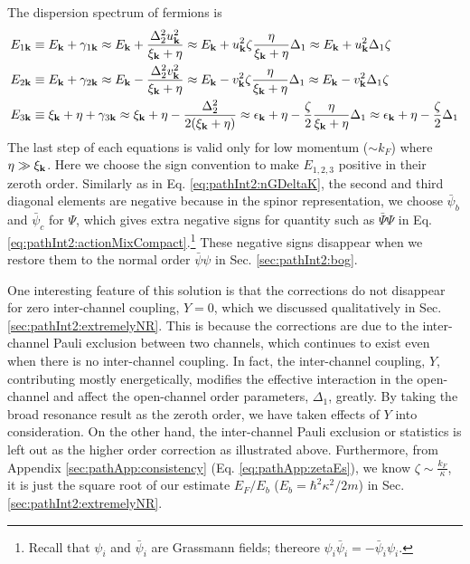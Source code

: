 The dispersion spectrum of fermions is
\begin{align}\label{eq:pathInt2:xiExpand}
E_{1\mathbf{k}}&\equiv{}E_{\mathbf{k}}+\gamma_{1\mathbf{k}}\approx{}E_{\mathbf{k}}+\frac{\Delta_{2}^{2}u_{\mathbf{k}}^{2}}{\xi_{\mathbf{k}}+\eta}
\approx{}E_{\mathbf{k}}+u_{\mathbf{k}}^{2}\zeta\frac{\eta}{\xi_{\mathbf{k}}+\eta}\Delta_{1}
\approx{}E_{\mathbf{k}}+u_{\mathbf{k}}^{2}\Delta_{1}\zeta\\
E_{2\mathbf{k}}&\equiv{}E_{\mathbf{k}}+\gamma_{2\mathbf{k}}\approx{}E_{\mathbf{k}}-\frac{\Delta_{2}^{2}v_{\mathbf{k}}^{2}}{\xi_{\mathbf{k}}+\eta}
\approx{}E_{\mathbf{k}}-v_{\mathbf{k}}^{2}\zeta\frac{\eta}{\xi_{\mathbf{k}}+\eta}\Delta_{1}
\approx{}E_{\mathbf{k}}-v_{\mathbf{k}}^{2}\Delta_{1}\zeta\label{eq:pathInt2:xiExpand2}\\
E_{3\mathbf{k}}&\equiv{}\xi_{\mathbf{k}}+\eta+\gamma_{3\mathbf{k}}\approx{}\xi_{\mathbf{k}}+\eta-\frac{\Delta_{2}^{2}}{2(\xi_{\mathbf{k}}+\eta)}
\approx{}\epsilon_{\mathbf{k}}+\eta-\frac{\zeta}{2}\frac{\eta}{\xi_{\mathbf{k}}+\eta}\Delta_{1}
\approx{}\epsilon_{\mathbf{k}}+\eta-\frac{\zeta}{2}\Delta_{1}
\label{eq:pathInt2:xiExpand3}
\end{align}
The last step of each equations is valid only for low momentum ($\sim{k_{F}}$) where $\eta\gg\xi_{\mathbf{k}}$. 
Here we choose the sign convention to make  $E_{1,2,3}$  positive in their zeroth order.  Similarly as in Eq.  \ref{eq:pathInt2:nGDeltaK}, the second and third diagonal elements are negative because in the spinor representation, we choose $\bar{\psi}_{b}$ and $\bar{\psi}_{c}$ for $\Psi$, which gives extra negative signs for quantity such as $\bar\Psi\Psi$ in Eq. \ref{eq:pathInt2:actionMixCompact}.\footnote{Recall that $\psi_{i}$ and $\bar\psi_{i}$ are Grassmann fields; thereore $\psi_{i}\bar\psi_{i}=-\bar\psi_{i}\psi_{i}$. }  These negative signs disappear when we restore them to the normal order $\bar\psi\psi$ in Sec. \ref{sec:pathInt2:bog}.  %


One interesting  feature of this solution  is that the corrections do not disappear for zero inter-channel coupling, $Y=0$, which we discussed qualitatively in Sec. \ref{sec:pathInt2:extremelyNR}.     This is because the corrections are due to the inter-channel Pauli exclusion between two channels, which continues to exist even when there is no inter-channel coupling.  In fact, the inter-channel coupling, $Y$, contributing mostly energetically, modifies the effective interaction in the open-channel and affect the open-channel order parameters,  $\Delta_{1}$, greatly.  By taking the broad resonance result as the zeroth order, we have taken effects of $Y$ into consideration.  On the other hand, the inter-channel Pauli exclusion or statistics is left out as the higher order correction as illustrated above. Furthermore, from Appendix \ref{sec:pathApp:consistency} (Eq. \ref{eq:pathApp:zetaEs}), we know $\zeta\sim\frac{k_F}{\kappa}$, it is just the square root of our estimate  $E_F/E_b$ ($E_b=\hbar^2\kappa^2/2m$) in Sec. \ref{sec:pathInt2:extremelyNR}.


